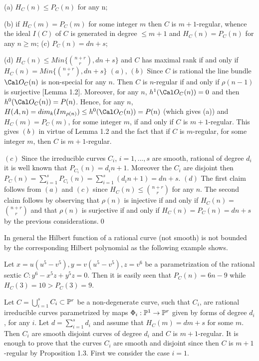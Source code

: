 (a) $H_C(n)\leq P_C(n)$ for any n;\medskip

(b) if $H_C(m)=P_C(m)$ for some integer $m$ then $C$ is $m+1$-regular,
whence
  the ideal $I(C)$ of $C$
is generated in degree $\leq m+1$ and
 $H_C(n)=P_C(n)$ for any $n\geq m$;
\medskip
(c) $P_C(n)=dn+s$; \medskip

(d) $H_C(n)\leq Min\{$$n+r\choose r$$, dn+s\}$ and
 $C$ has maximal rank if and only if
$H_C(n)=Min\{ $$n+r\choose r$$, dn+s \}$ \medskip
\endproclaim
{}
 $(a)$, $(b)$ Since $C$ is rational the line bundle $\Cal O_C(n)$ is
non-special
for any $n$. 
Then $C$ is $n$-regular if and only if $\rho(n-1)$ is surjective [Lemma
1.2].
Moreover, for any $n$,  $h^1(\Cal O_C(n))=0$ and then  $h^0(\Cal
O_C(n))=P(n)$.
Hence, for any $n$, $H(A,n)=dim_k(Im_{\rho(n)})\leq h^0(\Cal O_C(n))=P(n)$
 (which gives (a)) and $H_C(m)=P_C(m)$, for some integer $m$, if and only
if
 $C$ is $m+1$-regular.
 This gives $(b)$ in virtue of Lemma 1.2 and the fact that if $C$ is
$m$-regular,
for some integer $m$, then $C$ is $m+1$-regular.\medskip
 

$(c)$ Since the irreducible curves $C_i$, $i=1,...,s$ are smooth, rational
of degree $d_i$ it is well known that $P_{C_i}(n)=d_in+1$. Moreover the
$C_i$ are disjoint then
$P_C(n)=\sum_{i=1}^s P_{C_i}(n)=\sum_{i=1}^s (d_in+1)=dn+s$.
\medskip
$(d)$ The first claim follows from $(a)$ and $(c)$ since
 $H_C(n) \leq $$n+r\choose r$$ $
for any $n$.
The second claim follows by observing that $\rho(n)$ is injective if and
only if
$H_C(n)= $$n+r\choose r$$ $ and that $\rho(n)$ is surjective if 
and only if $H_C(n)=P_C(n)=dn+s$ by the previous
considerations.\qed\enddemo

In general the Hilbert function of a rational curve (not smooth) is not
bounded by 
the corresponding Hilbert polynomial as the following example shows.


 Let $x=u(u^5-v^5),y=v(u^5-v^5),z=v^6$
 be a parametrization of the rational sextic
$C:y^6-x^5z+y^5z=0$. Then it is easily seen that $P_C(n)=6n-9$
 while $H_C(3)=10> P_C(3)=9$.
\endproclaim

 Let $C=$$\bigcup_{i=1}^s$$ C_i  \subset \Bbb
P^r$
 be a non-degenerate curve,  
such that $C_i$, are rational irreducible curves parametrized by  maps 
$\Phi_i:\Bbb P^1 \rightarrow \Bbb P^r$
given by forms
of degree $d_i$, for any $i$. Let $d=\sum_{i=1}^s d_i$
and assume that $H_C(m)=dm+s$ for some $m$. Then  $C_i$ are smooth
disjoint curves of 
degree $d_i$ and $C$ is $m+1$-regular.\endproclaim
{} It is enough to prove that the curves $C_i$ are smooth and
disjoint
since then $C$ is $m+1$-regular by Proposition 1.3.\medskip
First we consider the case $i=1$.\medskip 

